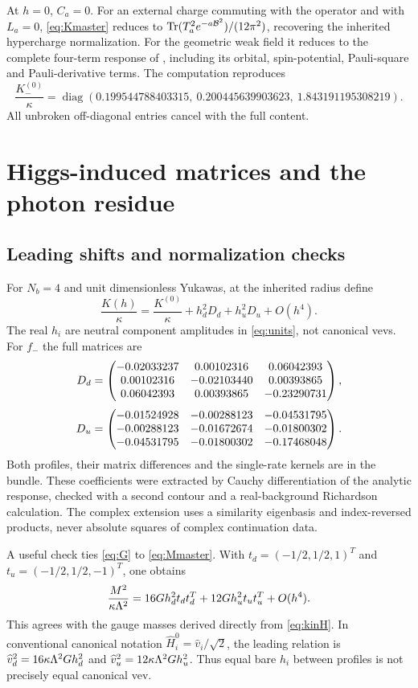 \documentclass[11pt,letterpaper]{article}
\DeclareMathOperator{\Tr}{Tr}\DeclareMathOperator{\diag}{diag}
\begin{document}
At $h=0$, $C_a=0$. For an external charge commuting with the operator and with $L_a=0$, \eqref{eq:Kmaster} reduces to $\Tr(T_a^2e^{-a\B^2})/(12\pi^2)$, recovering the inherited hypercharge normalization. For the geometric weak field it reduces to the complete four-term response of \cite[Eq.~(19)]{weak}, including its orbital, spin-potential, Pauli-square and Pauli-derivative terms. The computation reproduces
\begin{equation}
 \frac{K^{(0)}_-}{\kappa}=\diag(0.199544788403315,\ 0.200445639903623,\ 1.843191195308219).
\end{equation}
All unbroken off-diagonal entries cancel with the full content.

\section{Higgs-induced matrices and the photon residue}

\subsection{Leading shifts and normalization checks}

For $N_b=4$ and unit dimensionless Yukawas, at the inherited radius define
\begin{equation}
 \frac{K(h)}\kappa=\frac{K^{(0)}}\kappa+h_d^2D_d+h_u^2D_u+O(h^4).
 \label{eq:Ddef}
\end{equation}
The real $h_i$ are neutral component amplitudes in \eqref{eq:units}, not canonical vevs. For $f_-$ the full matrices are
\begin{align}
 D_d&=\begin{pmatrix}-0.02033237 & 0.00102316 & 0.06042393\\0.00102316 & -0.02103440 & 0.00393865\\0.06042393 & 0.00393865 & -0.23290731\end{pmatrix},\label{eq:Dd}\\[3pt]
 D_u&=\begin{pmatrix}-0.01524928 & -0.00288123 & -0.04531795\\-0.00288123 & -0.01672674 & -0.01800302\\-0.04531795 & -0.01800302 & -0.17468048\end{pmatrix}.\label{eq:Du}
\end{align}
Both profiles, their matrix differences and the single-rate kernels are in the bundle. These coefficients were extracted by Cauchy differentiation of the analytic response, checked with a second contour and a real-background Richardson calculation. The complex extension uses a similarity eigenbasis and index-reversed products, never absolute squares of complex continuation data.

A useful check ties \eqref{eq:G} to \eqref{eq:Mmaster}. With $t_d=(-1/2,1/2,1)^T$ and $t_u=(-1/2,1/2,-1)^T$, one obtains
\begin{equation}
 \frac{M^2}{\kappa\Lambda^2}=16G h_d^2t_dt_d^T+12G h_u^2t_ut_u^T+O(h^4).
 \label{eq:Ward}
\end{equation}
This agrees with the gauge masses derived directly from \eqref{eq:kinH}. In conventional canonical notation $\widehat H_i^0=\widehat v_i/\sqrt2$, the leading relation is $\widehat v_d^2=16\kappa\Lambda^2G h_d^2$ and $\widehat v_u^2=12\kappa\Lambda^2G h_u^2$. Thus equal bare $h_i$ between profiles is not precisely equal canonical vev.
\end{document}
